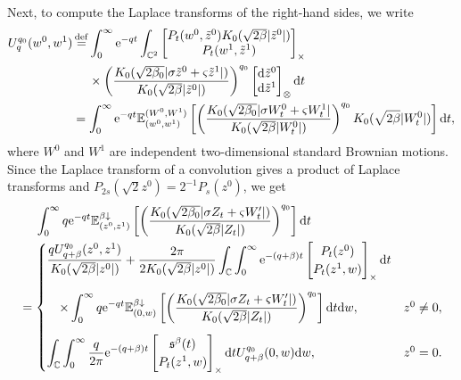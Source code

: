 \documentclass[12pt, twoside]{article}
\numberwithin{figure}{section}
\newcommand{\e}{{\mathrm e}}
\newcommand{\1}{\mathds 1}
\newcommand{\da}{{\downarrow}}
\newcommand{\E}{{\mathbb E}}
\renewcommand{\d}{{\mathrm d}}
\newcommand{\2}{{\mathbf 1}}
\newcommand{\s}{{\mathfrak s}}
\newcommand{\defeq}{{\stackrel{\rm def}{=}}}
\newcommand{\two}{{\sqrt{2}}}
\begin{document}
Next, to compute the Laplace transforms of the right-hand sides, we write
\begin{align}
U^{q_0}_q(w^0,w^1)&\,\defeq \int_0^\infty \e^{-qt}\int_{\Bbb C^2}
\begin{bmatrix}
P_t(w^0,\tilde{z}^0) K_0(\sqrt{2\beta}|\tilde{z}^0|)\\
P_t(w^1,\tilde{z}^1)
\end{bmatrix}_\times\notag\\
&\quad \;\times\left(\frac{K_0(\sqrt{2\beta_0}|\sigma \tilde{z}^0+\varsigma \tilde{z}^1|)}{K_0(\sqrt{2\beta}|\tilde{z}^0|)}\right)^{q_0}\begin{bmatrix}
\d \tilde{z}^0\\
\d \tilde{z}^1
\end{bmatrix}_\otimes \d t\notag\\
&=\int_0^\infty \e^{-qt}\E^{(W^0,W^1)}_{(w^0,w^1)}\left[\left(\frac{K_0(\sqrt{2\beta_0}|\sigma W^0_t+\varsigma W_t^1|}{K_0(\sqrt{2\beta}|W_t^0|)}\right)^{q_0}K_0(\sqrt{2\beta}
|W^0_t|)
\right] \d t,\label{def:Uqq}
\end{align}
where  $W^0$ and $W^1$ are independent two-dimensional standard Brownian motions.
Since the Laplace transform of a convolution gives a product of Laplace transforms and $P_{2s}(\two z^0)=2^{-1}P_s(z^0)$, we get
\begin{align}
\begin{aligned}\label{K0K0bdd}
&\quad\;\int_0^\infty q\e^{-qt}\E^{\beta\da}_{(z^0,z^1)}\left[\left(\frac{K_0(\sqrt{2\beta_0}|\sigma Z_t+\varsigma W'_t|)}{K_0(\sqrt{2\beta}|Z_t|)}\right)^{q_0}\right]\d t\\
&=
\begin{cases} 
\displaystyle \frac{qU^{q_0}_{q+\beta}(z^0,z^1)}{K_0(\sqrt{2\beta}|z^0|)}+\frac{2\pi }{2K_0(\sqrt{2\beta}|z^0|)}
\int_{\Bbb C}\int_0^\infty \e^{-(q+\beta)t}
\begin{bmatrix}
P_t(z^0)\\
P_t(z^1,w)
\end{bmatrix}_{\times}\d t\\
\vspace{-.2cm}\\
\quad \displaystyle  \times \int_0^\infty q\e^{-qt}\E^{\beta\da}_{(0,w)}\left[\left(\frac{K_0(\sqrt{2\beta_0}|\sigma Z_t+\varsigma W'_t|)}{K_0(\sqrt{2\beta}|Z_t|)}\right)^{q_0}\right]\d t   \d w,&z^0\neq 0,\\
\vspace{-.2cm}\\
\displaystyle 
\int_{\Bbb C}\int_0^\infty \frac{q}{2\pi }\e^{-(q+\beta) t}\begin{bmatrix}
\s^\beta(t)\\
P_t(z^1,w)
\end{bmatrix}_\times
  \d t U^{q_0}_{q+\beta}(0,w) \d w, &z^0=0.
\end{cases}
\end{aligned}
\end{align}
\end{document}
